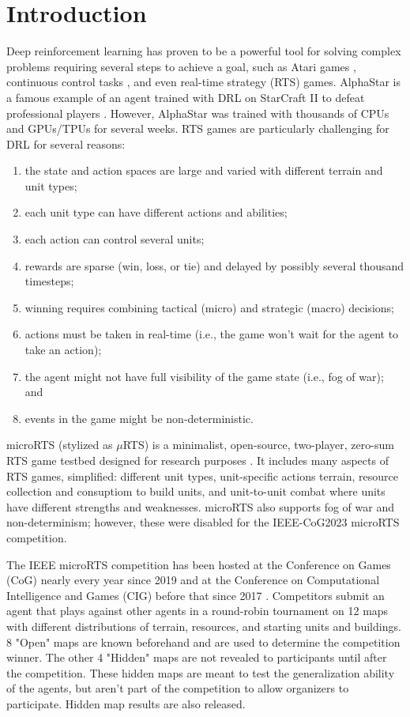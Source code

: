 \documentclass{article}
\begin{document}
\section{Introduction}
Deep reinforcement learning has proven to be a powerful tool for solving complex
problems requiring several steps to achieve a goal, such as Atari games \citep{DBLP:journals/corr/MnihKSGAWR13}, continuous
control tasks \citep{DBLP:journals/corr/LillicrapHPHETS15}, and even real-time strategy
(RTS) games. AlphaStar is a famous example of an agent trained with DRL on StarCraft
II to defeat professional players \citep{Vinyals2019GrandmasterLI}. However, AlphaStar was trained with thousands of
CPUs and GPUs/TPUs for several weeks. RTS games are particularly challenging for DRL for
several reasons:
\begin{enumerate}
    \item the state and action spaces are large and varied with different terrain and
        unit types;
    \item each unit type can have different actions and abilities;
    \item each action can control several units;
    \item rewards are sparse (win, loss, or tie) and delayed by possibly several
    thousand timesteps;
    \item winning requires combining tactical (micro) and strategic (macro) decisions;
    \item actions must be taken in real-time (i.e., the game won't wait for the agent to
        take an action);
    \item the agent might not have full visibility of the game state (i.e., fog of war); and
    \item events in the game might be non-deterministic.
\end{enumerate}

microRTS (stylized as $\mu$RTS) is a minimalist, open-source, two-player, zero-sum RTS game testbed designed for research
purposes \citep{Ontan2013TheCM}. It includes many aspects of RTS games, simplified: different unit types, unit-specific
actions terrain, resource collection and consuptiom to build units, and unit-to-unit combat
where units have different strengths and weaknesses. microRTS also supports fog of war
and non-determinism; however, these were disabled for the IEEE-CoG2023 microRTS
competition.

The IEEE microRTS competition has been hosted at the Conference on Games (CoG) nearly
every year since 2019 and at the Conference on Computational Intelligence and Games
(CIG) before that since 2017 \citep{Ontañón_Barriga_Silva_Moraes_Lelis_2018}.
Competitors submit an agent that plays against other agents in a round-robin tournament
on 12 maps with different distributions of terrain, resources, and starting units and
buildings. 8 "Open" maps are known beforehand and are used to determine the competition winner.
The other 4 "Hidden" maps are not revealed to participants until after the competition.
These hidden maps are meant to test the generalization ability of the agents, but aren't
part of the competition to allow organizers to participate. Hidden map results are also
released.
\end{document}
